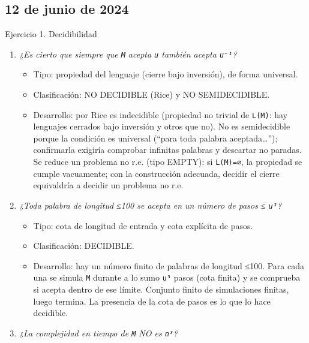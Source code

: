 \documentclass[12pt]{book} %
\providecommand{\tightlist}{%
  \setlength{\itemsep}{0pt}\setlength{\parskip}{0pt}}
\begin{document}
\hypertarget{de-junio-de-2024}{%
\subsection{12 de junio de 2024}\label{de-junio-de-2024}}

Ejercicio 1. Decidibilidad

\begin{enumerate}
\def\labelenumi{\arabic{enumi}.}
\tightlist
\item
  \emph{¿Es cierto que siempre que \texttt{M} acepta \texttt{u} también
  acepta \texttt{u⁻¹}?}

  \begin{itemize}
  \tightlist
  \item
    Tipo: propiedad del lenguaje (cierre bajo inversión), de forma
    universal.
  \item
    Clasificación: NO DECIDIBLE (Rice) y NO SEMIDECIDIBLE.
  \item
    Desarrollo: por Rice es indecidible (propiedad no trivial de
    \texttt{L(M)}: hay lenguajes cerrados bajo inversión y otros que
    no). No es semidecidible porque la condición es universal (``para
    toda palabra aceptada\ldots{}''); confirmarla exigiría comprobar
    infinitas palabras y descartar no paradas. Se reduce un problema no
    r.e. (tipo EMPTY): si \texttt{L(M)=∅}, la propiedad se cumple
    vacuamente; con la construcción adecuada, decidir el cierre
    equivaldría a decidir un problema no r.e.
  \end{itemize}
\item
  \emph{¿Toda palabra de longitud ≤100 se acepta en un número de pasos ≤
  \texttt{\textbar{}u\textbar{}³}?}

  \begin{itemize}
  \tightlist
  \item
    Tipo: cota de longitud de entrada y cota explícita de pasos.
  \item
    Clasificación: DECIDIBLE.
  \item
    Desarrollo: hay un número finito de palabras de longitud ≤100. Para
    cada una se simula \texttt{M} durante a lo sumo
    \texttt{\textbar{}u\textbar{}³} pasos (cota finita) y se comprueba
    si acepta dentro de ese límite. Conjunto finito de simulaciones
    finitas, luego termina. La presencia de la cota de pasos es lo que
    lo hace decidible.
  \end{itemize}
\item
  \emph{¿La complejidad en tiempo de \texttt{M} NO es \texttt{n³}?}


\end{enumerate}
\end{document}
